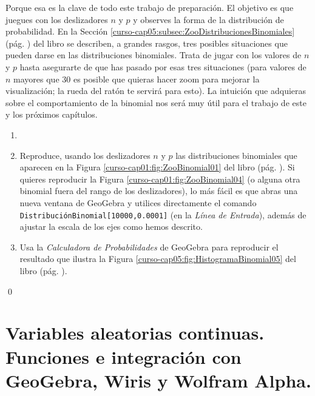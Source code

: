 \documentclass[10pt,a4paper]{article}\usepackage[]{graphicx}\usepackage[]{color}
\newcounter{cont01}
\begin{document}
Porque esa es la clave de todo este trabajo de preparación. El objetivo es que juegues con los deslizadores $n$ y $p$ y observes la forma de la distribución de probabilidad. En la Sección \ref{curso-cap05:subsec:ZooDistribucionesBinomiales} (pág. \pageref{curso-cap05:subsec:ZooDistribucionesBinomiales}) del libro se describen, a grandes rasgos, tres posibles situaciones que pueden darse en las distribuciones binomiales. Trata de jugar con los valores de $n$ y $p$ hasta asegurarte de que has pasado por esas tres situaciones (para valores de $n$ mayores que $30$ es posible que quieras hacer zoom para mejorar la visualización; la rueda del ratón te servirá para esto). La intuición que adquieras sobre el comportamiento de la binomial nos será muy útil para el trabajo de este y los próximos capítulos.

\begin{ejercicio}
\label{tut05:ejercicio11}
\begin{enumerate}
  \item[]
  \item Reproduce, usando los deslizadores $n$ y $p$ las distribuciones binomiales que aparecen en la Figura \ref{curso-cap01:fig:ZooBinomial01} del libro (pág. \pageref{curso-cap01:fig:ZooBinomial01}). Si quieres reproducir la Figura \ref{curso-cap01:fig:ZooBinomial04} (o alguna otra binomial fuera del rango de los deslizadores), lo más fácil es que abras una nueva ventana de GeoGebra y utilices directamente el comando {\tt DistribuciónBinomial[10000,0.0001]} (en la {\em Línea de Entrada}), además de ajustar la escala de los ejes como hemos descrito.

  \item Usa la {\em Calculadora de Probabilidades} de GeoGebra para reproducir el resultado que ilustra la Figura \ref{curso-cap05:fig:HistogramaBinomial05} del libro (pág. \pageref{curso-cap05:fig:HistogramaBinomial05}).
\end{enumerate}
\qed
\end{ejercicio}

\section{Variables aleatorias continuas. Funciones e integración con GeoGebra, Wiris y Wolfram Alpha.}
\label{tut05:sec:IntegracionWirisWolfram}


%
\end{document}
